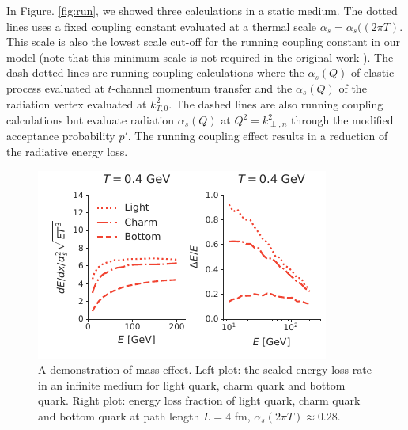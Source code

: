 \documentclass[aps, prc, reprint, amsmath, groupedaddress, nofootinbib]{revtex4-1}
\begin{document}
In Figure. \ref{fig:run}, we showed three calculations in a static medium. The dotted lines uses a fixed coupling constant evaluated at a thermal scale $\alpha_s = \alpha_s((2\pi T)$.
This scale is also the lowest scale cut-off for the running coupling constant in our model (note that this minimum scale is not required in the original work \cite{Arnold:2008zu}).
The dash-dotted lines are running coupling calculations where the $\alpha_s(Q)$ of elastic process evaluated at $t$-channel momentum transfer and the $\alpha_s(Q)$ of the radiation vertex evaluated at $k_{T,0}^2$.
The dashed lines are also running coupling calculations but evaluate radiation $\alpha_s(Q)$ at $Q^2 = k_{\perp,n}^2$ through the modified acceptance probability $p'$.
The running coupling effect results in a reduction of the radiative energy loss.

\begin{figure}
\includegraphics[width=\columnwidth]{Eloss_mass.pdf}
\caption{A demonstration of mass effect. Left plot: the scaled energy loss rate in an infinite medium for light quark, charm quark and bottom quark. Right plot: energy loss fraction of light quark, charm quark and bottom quark at path length $L=4$ fm, $\alpha_s(2\pi T) \approx 0.28$. }
\label{fig:mass}
\end{figure}
\end{document}
